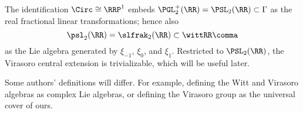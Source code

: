 \begin{remark}
	The identification $\Circ\cong\RRP^1$ embeds $\PGL_2^+(\RR) = \PSL_2(\RR)\subset\Gamma$ as the real fractional linear
	transformations; hence also
	\begin{equation*}
		\psl_2(\RR) = \slfrak_2(\RR)\subset\wittRR \comma
	\end{equation*}
	as the Lie algebra generated by
	$\xi_{-1}$, $\xi_0$, and $\xi_1$. Restricted to $\PSL_2(\RR)$, the Virasoro central extension is trivializable,
	which will be useful later.
\end{remark}


\begin{remark}
	Some authors' definitions will differ. 
	For example, defining the Witt and Virasoro algebras as complex Lie algebras, or
	defining the Virasoro group as the universal cover of ours. 
\end{remark}

